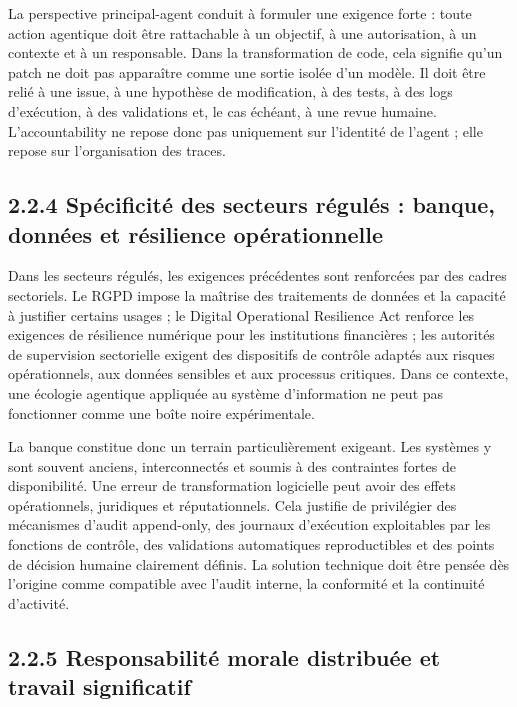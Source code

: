 La perspective principal-agent conduit à formuler une exigence forte : toute action agentique doit être rattachable à un objectif, à une autorisation, à un contexte et à un responsable. Dans la transformation de code, cela signifie qu'un patch ne doit pas apparaître comme une sortie isolée d'un modèle. Il doit être relié à une issue, à une hypothèse de modification, à des tests, à des logs d'exécution, à des validations et, le cas échéant, à une revue humaine. L'accountability ne repose donc pas uniquement sur l'identité de l'agent ; elle repose sur l'organisation des traces.

\subsection{2.2.4 Spécificité des secteurs régulés : banque, données et résilience opérationnelle}\label{spuxe9cificituxe9-des-secteurs-ruxe9guluxe9s-banque-donnuxe9es-et-ruxe9silience-opuxe9rationnelle}

Dans les secteurs régulés, les exigences précédentes sont renforcées par des cadres sectoriels. Le RGPD impose la maîtrise des traitements de données et la capacité à justifier certains usages ; le Digital Operational Resilience Act renforce les exigences de résilience numérique pour les institutions financières ; les autorités de supervision sectorielle exigent des dispositifs de contrôle adaptés aux risques opérationnels, aux données sensibles et aux processus critiques. Dans ce contexte, une écologie agentique appliquée au système d'information ne peut pas fonctionner comme une boîte noire expérimentale.

La banque constitue donc un terrain particulièrement exigeant. Les systèmes y sont souvent anciens, interconnectés et soumis à des contraintes fortes de disponibilité. Une erreur de transformation logicielle peut avoir des effets opérationnels, juridiques et réputationnels. Cela justifie de privilégier des mécanismes d'audit append-only, des journaux d'exécution exploitables par les fonctions de contrôle, des validations automatiques reproductibles et des points de décision humaine clairement définis. La solution technique doit être pensée dès l'origine comme compatible avec l'audit interne, la conformité et la continuité d'activité.

\subsection{2.2.5 Responsabilité morale distribuée et travail significatif}\label{responsabilituxe9-morale-distribuuxe9e-et-travail-significatif}

